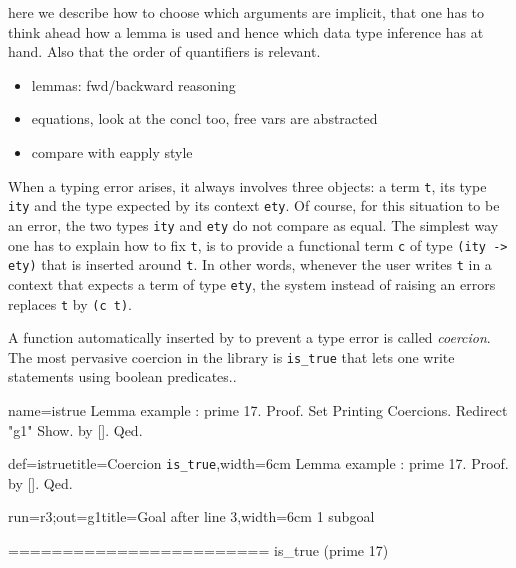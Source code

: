 here we describe how to choose which arguments are implicit,
that one has to think ahead how  a lemma is used and hence
which data type inference has at hand.  Also that the order
of quantifiers is relevant.
\begin{itemize}
\item lemmas: fwd/backward reasoning
\item equations, look at the concl too, free vars are abstracted
\item compare with eapply style
\end{itemize}

\mcbREQUIRE{}
\mcbPROVIDE{}


When a typing error arises, it always involves three objects:
a term \lstinline/t/, its type \lstinline/ity/ and the type
expected by its context \lstinline/ety/.  Of course, for this
situation to be an error, the two types \lstinline/ity/ and
\lstinline/ety/ do not compare as equal.
The simplest way one has to explain \Coq{} how to fix \lstinline/t/,
is to provide a functional term \lstinline/c/ of type
\lstinline/(ity -> ety)/ that is inserted around \lstinline/t/.
In other words, whenever the user writes \lstinline/t/ in a context
that expects a term of type \lstinline/ety/, the system instead of
raising an errors replaces \lstinline/t/ by \lstinline/(c t)/.

A function automatically inserted by \Coq{} to prevent a type
error is called \emph{coercion}.
The most pervasive coercion in the \mcbMC{} library is
\lstinline/is_true/ that lets one write statements using boolean
predicates..

\begin{coqdef}{name=istrue}
Lemma example : prime 17.
Proof.
Set Printing Coercions. Redirect "g1" Show.
by [].
Qed.
\end{coqdef}
\begin{coq}{def=istrue}{title=Coercion \lstinline/is_true/,width=6cm}
Lemma example : prime 17.
Proof.  by [].  Qed.
\end{coq}
\begin{coqout}{run=r3;out=g1}{title=Goal after line 3,width=6cm}
1 subgoal

========================
is_true (prime 17)
\end{coqout}

